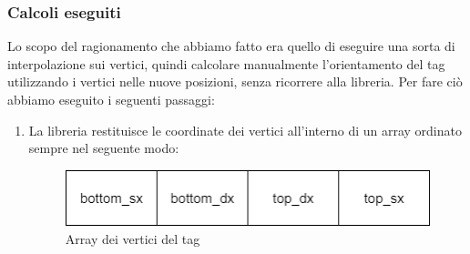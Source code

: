 \documentclass[]{article}
\begin{document}
\subsubsection*{Calcoli eseguiti}
Lo scopo del ragionamento che abbiamo fatto era quello di eseguire una sorta di interpolazione sui vertici, quindi calcolare manualmente l'orientamento del tag utilizzando i vertici nelle nuove posizioni, senza ricorrere alla libreria. Per fare ciò abbiamo eseguito i seguenti passaggi:
\begin{enumerate}
    \item La libreria restituisce le coordinate dei vertici all'interno di un array ordinato sempre nel seguente modo:
    \begin{figure}[H]
        \centering
        \includegraphics[width=0.5\linewidth]{immagini/array_vertici.png}
        \caption{Array dei vertici del tag}
    \end{figure}
    

\end{enumerate}
\end{document}
